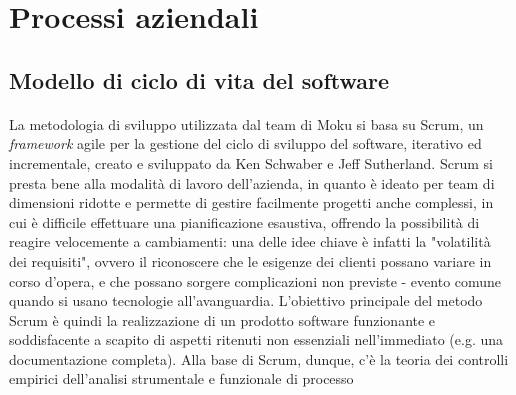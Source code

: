 \section{Processi aziendali}
\subsection{Modello di ciclo di vita del software}
\paragraph{}
La metodologia di sviluppo utilizzata dal team di Moku si basa su Scrum, un \textit{framework} agile per la gestione del ciclo di sviluppo del software, iterativo ed incrementale, creato e sviluppato da Ken Schwaber e Jeff Sutherland. Scrum si presta bene alla modalità di lavoro dell'azienda, in quanto è ideato per team di dimensioni ridotte e permette di gestire facilmente progetti anche complessi, in cui è difficile effettuare una pianificazione esaustiva, offrendo la possibilità di reagire velocemente a cambiamenti: una delle idee chiave è infatti la "volatilità dei requisiti", ovvero il riconoscere che le esigenze dei clienti possano variare in corso d'opera, e che possano sorgere complicazioni non previste - evento comune quando si usano tecnologie all'avanguardia. L'obiettivo principale del metodo Scrum è quindi la realizzazione di un prodotto software funzionante e soddisfacente a scapito di aspetti ritenuti non essenziali nell'immediato (e.g. una documentazione completa). 
Alla base di Scrum, dunque, c'è la teoria dei controlli empirici dell'analisi strumentale e funzionale di processo

